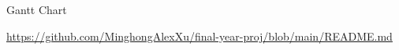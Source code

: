 \begin{frame}{Gantt Chart}

\url{https://github.com/MinghongAlexXu/final-year-proj/blob/main/README.md}

\end{frame}
